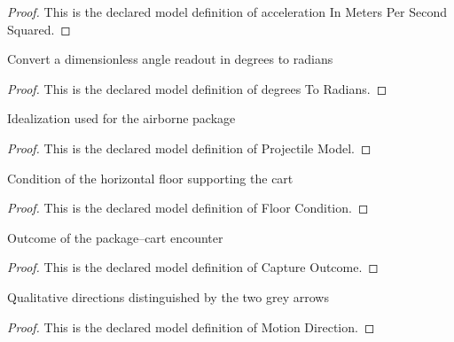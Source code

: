 \begin{proof}
  This is the declared model definition of acceleration In Meters Per Second Squared.
\end{proof}
\begin{definition}
  \label{def:physics:phyx-mini-0768:phyxminiproblems-problemphyxmini0768-degreestoradians}
  Convert a dimensionless angle readout in degrees to radians
\end{definition}
\begin{proof}
  This is the declared model definition of degrees To Radians.
\end{proof}
\begin{definition}
  \label{def:physics:phyx-mini-0768:phyxminiproblems-problemphyxmini0768-projectilemodel}
  Idealization used for the airborne package
\end{definition}
\begin{proof}
  This is the declared model definition of Projectile Model.
\end{proof}
\begin{definition}
  \label{def:physics:phyx-mini-0768:phyxminiproblems-problemphyxmini0768-floorcondition}
  Condition of the horizontal floor supporting the cart
\end{definition}
\begin{proof}
  This is the declared model definition of Floor Condition.
\end{proof}
\begin{definition}
  \label{def:physics:phyx-mini-0768:phyxminiproblems-problemphyxmini0768-captureoutcome}
  Outcome of the package--cart encounter
\end{definition}
\begin{proof}
  This is the declared model definition of Capture Outcome.
\end{proof}
\begin{definition}
  \label{def:physics:phyx-mini-0768:phyxminiproblems-problemphyxmini0768-motiondirection}
  Qualitative directions distinguished by the two grey arrows
\end{definition}
\begin{proof}
  This is the declared model definition of Motion Direction.
\end{proof}
